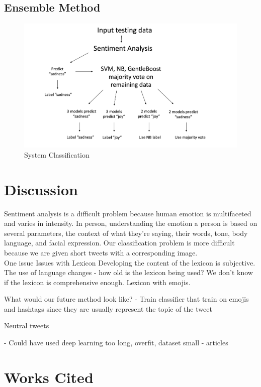 \documentclass[]{article}
\begin{document}
\subsection{Ensemble Method}

\begin{figure}
  \includegraphics[width=\linewidth]{Method.jpg}
  \caption{System Classification}
  \label{fig:System Classification}
\end{figure}





\section{Discussion}

Sentiment analysis is a difficult problem because human emotion is multifaceted and varies in intensity. In person, understanding the emotion a person is based on several parameters, the context of what they're saying, their words, tone, body language, and facial expression. Our classification problem is more difficult because we are given short tweets with a corresponding image. \\

One issue 
Issues with Lexicon
Developing the content of the lexicon is subjective. The use of language changes - how old is the lexicon being used? We don't know if the lexicon is comprehensive enough. Lexicon with emojis. 

What would our future method look like?
- Train classifier that train on emojis and hashtags since they are usually represent the topic of the tweet


Neutral tweets 


- Could have used deep learning 
	too long, overfit, dataset small
- articles 


\section{Works Cited}
\begin{thebibliography}{1}


\end{thebibliography}
\end{document}
